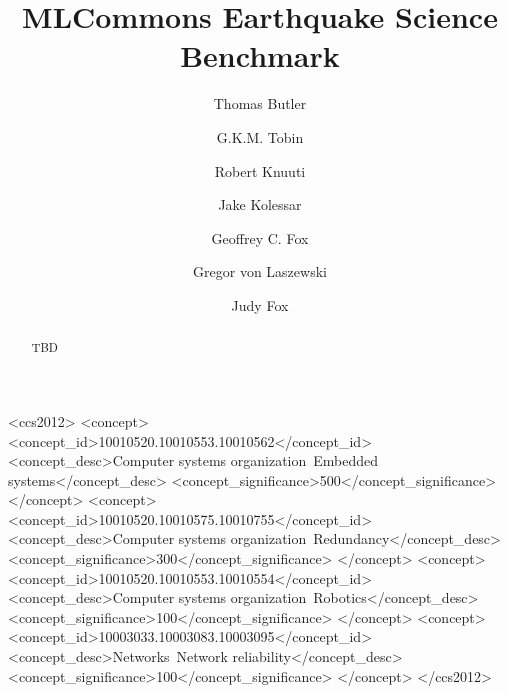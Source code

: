 \documentclass[sigplan,screen]{format/acmart}
\begin{document}
\title{MLCommons Earthquake Science Benchmark}

\author{Thomas Butler}
\author{G.K.M. Tobin}

\author{Robert Knuuti}

\author{Jake Kolessar}

\author{Geoffrey C. Fox}

\author{Gregor von Laszewski}

\author{Judy Fox}

\renewcommand{\shortauthors}{Buttler, Knuuti, Kolesar, Fox, von Laszewski}

\begin{abstract}
TBD
\end{abstract}

\begin{CCSXML}
<ccs2012>
 <concept>
  <concept_id>10010520.10010553.10010562</concept_id>
  <concept_desc>Computer systems organization~Embedded systems</concept_desc>
  <concept_significance>500</concept_significance>
 </concept>
 <concept>
  <concept_id>10010520.10010575.10010755</concept_id>
  <concept_desc>Computer systems organization~Redundancy</concept_desc>
  <concept_significance>300</concept_significance>
 </concept>
 <concept>
  <concept_id>10010520.10010553.10010554</concept_id>
  <concept_desc>Computer systems organization~Robotics</concept_desc>
  <concept_significance>100</concept_significance>
 </concept>
 <concept>
  <concept_id>10003033.10003083.10003095</concept_id>
  <concept_desc>Networks~Network reliability</concept_desc>
  <concept_significance>100</concept_significance>
 </concept>
</ccs2012>
\end{CCSXML}
\end{document}
